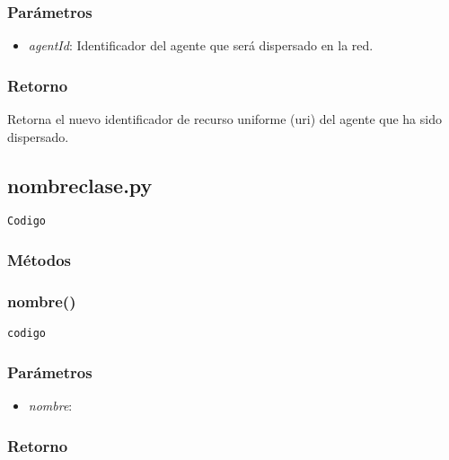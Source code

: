 \documentclass{article}
\begin{document}
\subsubsection*{Parámetros}
\begin{itemize}
\item \textit{agentId}: Identificador del agente que será dispersado en la red.
\end{itemize}
\subsubsection*{Retorno}
Retorna el nuevo identificador de recurso uniforme (uri) del agente que ha sido dispersado.

\subsection{nombreclase.py}
\begin{lstlisting}
Codigo
\end{lstlisting}
\subsubsection*{Métodos}
\subsubsection{\textbf{nombre}()}
\begin{lstlisting}
codigo
\end{lstlisting}
\subsubsection*{Parámetros}
\begin{itemize}
\item \textit{nombre}: 
\end{itemize}
\subsubsection*{Retorno}
\end{document}

